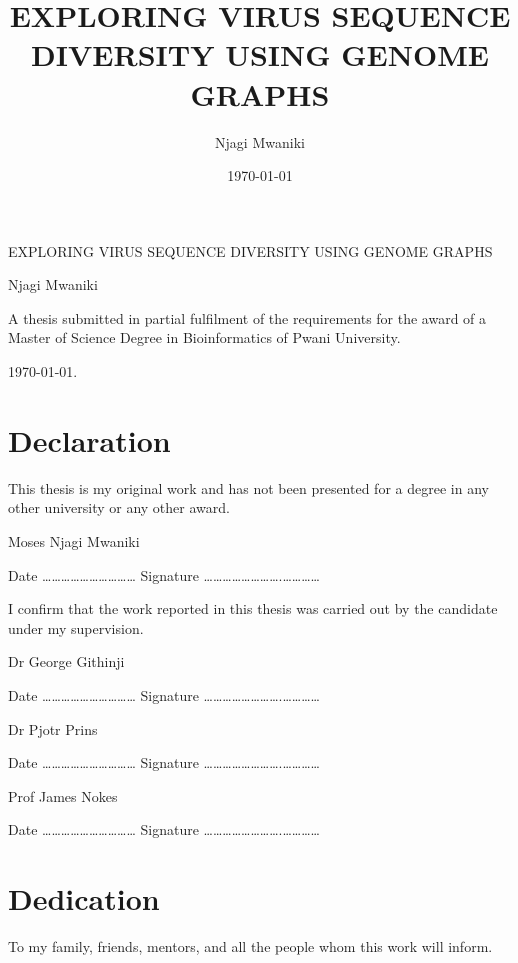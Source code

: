 \documentclass[10pt, a4paper]{article}
\author{Njagi Mwaniki}
\date{\today}
\title{EXPLORING VIRUS SEQUENCE DIVERSITY USING GENOME GRAPHS}
\begin{document}
\begin{titlepage}
\centering
{\LARGE EXPLORING VIRUS SEQUENCE DIVERSITY USING GENOME GRAPHS \par }
\vspace {8cm}
{\small Njagi Mwaniki \par}
\vspace {8cm} 
{\small A thesis submitted in partial fulfilment of the             requirements for the award of a Master of Science Degree in             Bioinformatics of Pwani University. \par}
\vspace {1mm} 
{\small \today. \par}
\end{titlepage}
\newcommand{\bigO}{\mathcal{O}}


\setcounter{secnumdepth}{0}
\newpage

\section{Declaration}
\label{sec:org86baee1}
This thesis is my original work and has not been presented for a degree in any other university or any other award.

\vspace{10mm}

Moses Njagi Mwaniki

Date …………………………    Signature …………………….…………

\vspace{20mm}
I confirm that the work reported in this thesis was carried out by the candidate under my supervision.

\vspace{10mm}

Dr George Githinji

Date …………………………    Signature …………………….…………

\vspace{10mm}

Dr Pjotr Prins

Date …………………………    Signature …………………….…………

\vspace{10mm}

Prof James Nokes

Date …………………………    Signature …………………….…………


\newpage

\section{Dedication}
\label{sec:org920c14a}
To my family, friends, mentors, and all the people whom this work will inform.
\end{document}
